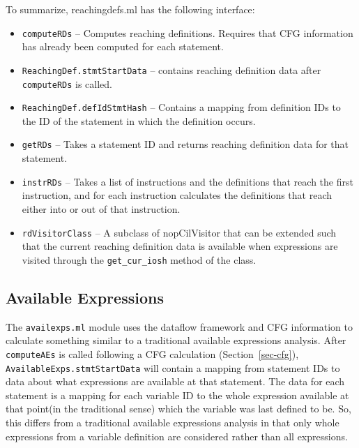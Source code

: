 \documentclass[letterpaper]{article}
\def\secref#1{Section~\ref{sec-#1}}
\def\t#1{{\tt #1}}
\begin{document}
To summarize, reachingdefs.ml has the following interface:
\begin{itemize}
\item \t{computeRDs} -- Computes reaching definitions. Requires that
CFG information has already been computed for each statement.
\item \t{ReachingDef.stmtStartData} -- contains reaching
definition data after \t{computeRDs} is called.
\item \t{ReachingDef.defIdStmtHash} -- Contains a mapping
from definition IDs to the ID of the statement in which
the definition occurs.
\item \t{getRDs} -- Takes a statement ID and returns
reaching definition data for that statement.
\item \t{instrRDs} -- Takes a list of instructions and the
definitions that reach the first instruction, and for
each instruction calculates the definitions that reach
either into or out of that instruction.
\item \t{rdVisitorClass} -- A subclass of nopCilVisitor that
can be extended such that the current reaching definition
data is available when expressions are visited through
the \t{get\_cur\_iosh} method of the class.
\end{itemize}

\subsection{Available Expressions}

The \t{availexps.ml} module uses the dataflow framework and CFG
information to calculate something similar to a traditional available
expressions analysis. After \t{computeAEs} is called following a CFG
calculation (\secref{cfg}), \t{AvailableExps.stmtStartData} will
contain a mapping
from statement IDs to data about what expressions are available at
that statement. The data for each statement is a mapping for each
variable ID to the whole expression available at that point(in the
traditional sense) which the variable was last defined to be. So,
this differs from a traditional available expressions analysis in that
only whole expressions from a variable definition are considered rather
than all expressions.
\end{document}
